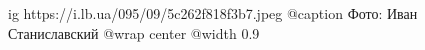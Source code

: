  
 
 
 
 

\ifcmt
  ig https://i.lb.ua/095/09/5c262f818f3b7.jpeg
	@caption Фото: Иван Станиславский
  @wrap center
  @width 0.9
\fi

